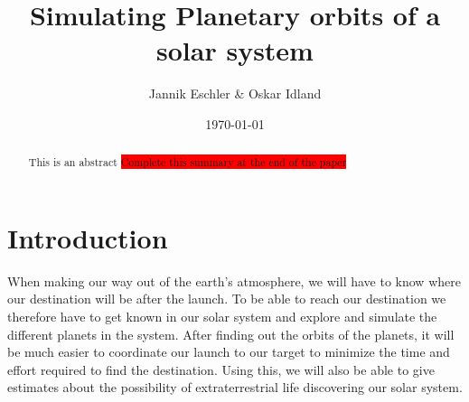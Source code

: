 \documentclass[reprint,english,notitlepage]{revtex4-2}
\begin{document}
\title{Simulating Planetary orbits of a solar system}
\author{Jannik Eschler \& Oskar Idland}
\date{\today}

\begin{abstract}
This is an abstract \colorbox{red}{Complete this summary at the end of the paper}
\end{abstract}
\maketitle

\section{Introduction}
When making our way out of the earth's atmosphere, we will have to know where our destination will be after the launch.
To be able to reach our destination we therefore have to get known in our solar system and explore and simulate the different planets in the system.
After finding out the orbits of the planets, it will be much easier to coordinate our launch to our target to minimize the time and effort required to find the destination.
Using this, we will also be able to give estimates about the possibility of extraterrestrial life discovering our solar system.
\end{document}
